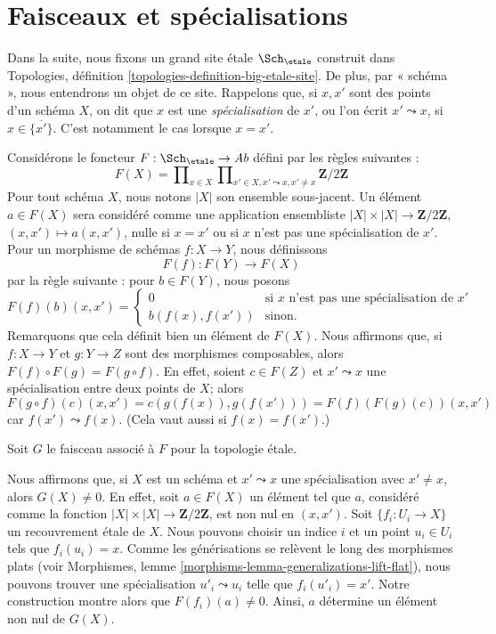 \section{Faisceaux et spécialisations}
\label{section-sheaves}

\noindent
Dans la suite, nous fixons un grand site \'etale $\Sch_\etale$
construit dans
Topologies, définition \ref{topologies-definition-big-etale-site}.
De plus, par « schéma », nous entendrons un objet de ce site.
Rappelons que, si $x, x'$ sont des points d'un schéma $X$, on dit que $x$ est une
{\it spécialisation} de $x'$, ou l'on écrit $x' \leadsto x$, si
$x \in \overline{\{x'\}}$. C'est notamment le cas lorsque $x = x'$.

\medskip\noindent
Considérons le foncteur $F : \Sch_\etale \to \textit{Ab}$
défini par les règles suivantes :
$$
F(X) = \prod\nolimits_{x \in X}
\prod\nolimits_{x' \in X, x' \leadsto x, x' \not = x}
\mathbf{Z}/2\mathbf{Z}
$$
Pour tout schéma $X$, nous notons $|X|$ son ensemble sous-jacent.
Un élément $a \in F(X)$ sera considéré comme une application ensembliste
$|X| \times |X| \to \mathbf{Z}/2\mathbf{Z}$, $(x, x') \mapsto a(x, x')$,
nulle si $x = x'$ ou si $x$ n'est pas une spécialisation de $x'$.
Pour un morphisme de schémas $f : X \to Y$, nous définissons
$$
F(f) : F(Y) \longrightarrow F(X)
$$
par la règle suivante : pour $b \in F(Y)$, nous posons
$$
F(f)(b)(x, x') =
\left\{
\begin{matrix}
0 & \text{si }x\text{ n'est pas une spécialisation de }x' \\
b(f(x), f(x')) & \text{sinon.}
\end{matrix}
\right.
$$
Remarquons que cela définit bien un élément de $F(X)$. Nous affirmons que, si
$f : X \to Y$ et $g : Y \to Z$ sont des morphismes composables, alors
$F(f) \circ F(g) = F(g \circ f)$. En effet, soient $c \in F(Z)$ et
$x' \leadsto x$ une spécialisation entre deux points de $X$; alors
$$
F(g \circ f)(c)(x, x') = c(g(f(x)), g(f(x'))) = F(f)(F(g)(c))(x, x')
$$
car $f(x') \leadsto f(x)$. (Cela vaut aussi si $f(x) = f(x')$.)

\medskip\noindent
Soit $G$ le faisceau associé à $F$ pour la topologie \'etale.

\medskip\noindent
Nous affirmons que, si $X$ est un schéma et $x' \leadsto x$ une spécialisation
avec $x' \not = x$, alors $G(X) \not = 0$. En effet, soit $a \in F(X)$
un élément tel que $a$, considéré comme la fonction
$|X| \times |X| \to \mathbf{Z}/2\mathbf{Z}$, est non nul en $(x, x')$.
Soit $\{f_i : U_i \to X\}$ un recouvrement \'etale de $X$. Nous pouvons choisir un
indice $i$ et un point $u_i \in U_i$ tels que $f_i(u_i) = x$. Comme les générisations
se relèvent le long des morphismes plats (voir
Morphismes, lemme \ref{morphisms-lemma-generalizations-lift-flat}),
nous pouvons trouver une spécialisation $u'_i \leadsto u_i$
telle que $f_i(u'_i) = x'$. Notre construction montre alors que
$F(f_i)(a) \not = 0$. Ainsi, $a$ détermine un élément non nul de $G(X)$.

